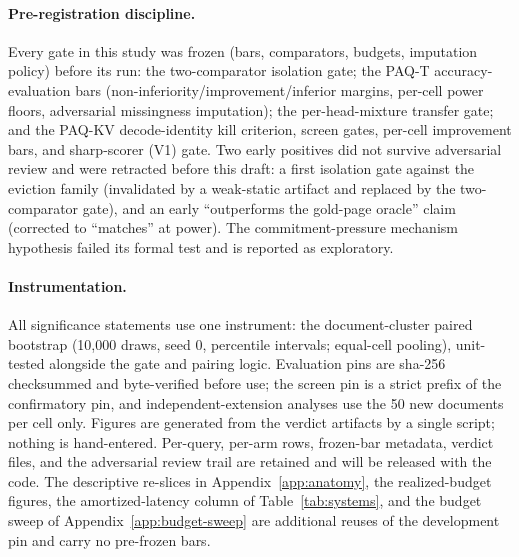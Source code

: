 \documentclass[letterpaper]{article} %
\newcommand{\paqt}{\textsc{PAQ-T}}
\newcommand{\paqc}{\textsc{PAQ-KV}}
\begin{document}
\paragraph{Pre-registration discipline.} Every gate in this study was frozen (bars, comparators, budgets, imputation policy) before its run: the two-comparator isolation gate; the \paqt{} accuracy-evaluation bars (non-inferiority/improvement/inferior margins, per-cell power floors, adversarial missingness imputation); the per-head-mixture transfer gate; and the \paqc{} decode-identity kill criterion, screen gates, per-cell improvement bars, and sharp-scorer (V1) gate. Two early positives did not survive adversarial review and were retracted before this draft: a first isolation gate against the eviction family (invalidated by a weak-static artifact and replaced by the two-comparator gate), and an early ``outperforms the gold-page oracle'' claim (corrected to ``matches'' at power). The commitment-pressure mechanism hypothesis failed its formal test and is reported as exploratory.

\paragraph{Instrumentation.} All significance statements use one instrument: the document-cluster paired bootstrap (10{,}000 draws, seed 0, percentile intervals; equal-cell pooling), unit-tested alongside the gate and pairing logic. Evaluation pins are sha-256 checksummed and byte-verified before use; the screen pin is a strict prefix of the confirmatory pin, and independent-extension analyses use the 50 new documents per cell only. Figures are generated from the verdict artifacts by a single script; nothing is hand-entered. Per-query, per-arm rows, frozen-bar metadata, verdict files, and the adversarial review trail are retained and will be released with the code. The descriptive re-slices in Appendix~\ref{app:anatomy}, the realized-budget figures, the amortized-latency column of Table~\ref{tab:systems}, and the budget sweep of Appendix~\ref{app:budget-sweep} are additional reuses of the development pin and carry no pre-frozen bars.
\end{document}
